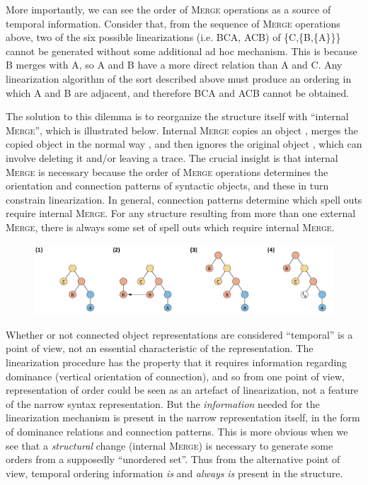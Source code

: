   More importantly, we can see the order of \textsc{Merge} operations as a source of temporal information. Consider that, from the sequence of \textsc{Merge} operations above, two of the six possible linearizations (i.e. BCA, ACB) of \{C,\{B,\{A\}\}\} cannot be generated without some additional ad hoc mechanism. This is because B merges with A, so A and B have a more direct relation than A and C. Any linearization algorithm of the sort described above must produce an ordering in which A and B are adjacent, and therefore BCA and ACB cannot be obtained.

  The solution to this dilemma is to reorganize the structure itself with “internal \textsc{Merge}”, which is illustrated below. Internal \textsc{Merge} copies an object , merges the copied object in the normal way , and then ignores the original object , which can involve deleting it and/or leaving a trace. The crucial insight is that internal \textsc{Merge} is necessary because the order of \textsc{Merge} operations determines the orientation and connection patterns of syntactic objects, and these in turn constrain linearization. In general, connection patterns determine which spell outs require internal \textsc{Merge}. For any structure resulting from more than one external \textsc{Merge}, there is always some set of spell outs which require internal \textsc{Merge}.

  
\begin{figure}
\includegraphics[width=\textwidth]{figures/Tilsen-img43.png}
\caption{\missingcaption}
\label{fig:}
\end{figure}
 

  Whether or not connected object representations are considered “temporal” is a point of view, not an essential characteristic of the representation. The linearization procedure has the property that it requires information regarding dominance (vertical orientation of connection), and so from one point of view, representation of order could be seen as an artefact of linearization, not a feature of the narrow syntax representation. But the \textit{information} needed for the linearization mechanism is present in the narrow representation itself, in the form of dominance relations and connection patterns. This is more obvious when we see that a \textit{structural} change (internal \textsc{Merge}) is necessary to generate some orders from a supposedly “unordered set”. Thus from the alternative point of view, temporal ordering information \textit{is} and \textit{always} \textit{is} present in the structure. 

